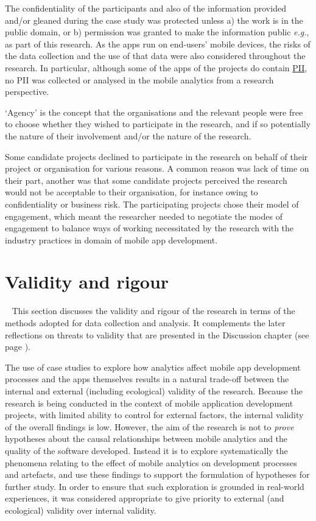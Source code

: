 The confidentiality of the participants and also of the information provided and/or gleaned during the case study was protected unless a) the work is in the public domain, or b) permission was granted to make the information public \textit{e.g.}, as part of this research.
As the apps run on end-users' mobile devices, the risks of the data collection and the use of that data were also considered throughout the research. In particular, although some of the apps of the projects do contain \href{glossary-pii}{PII}, no PII was collected or analysed in the mobile analytics from a research perspective.

`Agency' is the concept that the organisations and the relevant people were free to choose whether they wished to participate in the research, and if so potentially the nature of their involvement and/or the nature of the research. 

Some candidate projects declined to participate in the research on behalf of their project or organisation for various reasons. A common reason was lack of time on their part, another was that some candidate projects perceived the research would not be acceptable to their organisation, for instance owing to confidentiality or business risk. The participating projects chose their model of engagement, which meant the researcher needed to negotiate the modes of engagement to balance ways of working necessitated by the research with the industry practices in domain of mobile app development.


\section{Validity and rigour}~\label{methodology-threats-to-validity-section}
This section discusses the validity and rigour of the research in terms of the methods adopted for data collection and analysis. It complements the later reflections on threats to validity that are presented in the Discussion chapter (see page \pageref{discussion-threats-to-validity-section}).

The use of case studies to explore how analytics affect mobile app development processes and the apps themselves results in a natural trade-off between the internal and external%
(including ecological) validity of the research. Because the research is being conducted in the context of mobile application development projects, with limited ability to control for external factors, the internal validity of the overall findings is low. However, the aim of the research is not to \textit{prove} hypotheses about the causal  relationships between mobile analytics and the quality of the software developed.  Instead it is to explore systematically the phenomena relating to the effect of mobile analytics on development processes and artefacts, and use these findings to support the formulation of hypotheses for further study. In order to ensure that such exploration is grounded in real-world experiences, it was considered appropriate to give priority to  external (and ecological) validity over internal validity.

